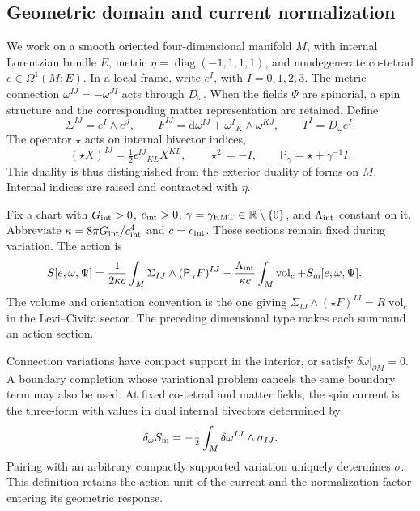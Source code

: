\subsection{Geometric domain and current normalization}
\label{vii:subsec:dominio-corriente-cartan}

We work on a smooth oriented four-dimensional manifold \(M\),
with internal Lorentzian bundle \(E\), metric
\(\eta=\operatorname{diag}(-1,1,1,1)\), and nondegenerate co-tetrad
\(e\in\Omega^1(M;E)\). In a local frame, write
\(e^I\), with \(I=0,1,2,3\). The metric connection
\(\omega^{IJ}=-\omega^{JI}\) acts through \(D_\omega\).
When the fields \(\Psi\) are spinorial, a spin structure and the
corresponding matter representation are retained. Define
\begin{equation}
 \Sigma^{IJ}=e^I\wedge e^J,\qquad
 F^{IJ}=\mathrm d\omega^{IJ}+\omega^I{}_{K}\wedge\omega^{KJ},
 \qquad T^I=D_\omega e^I.
 \label{vii:eq:campos-cartan}
\end{equation}
The operator \(\star\) acts on internal bivector indices,
\begin{equation}
 (\star X)^{IJ}=\tfrac12\epsilon^{IJ}{}_{KL}X^{KL},
 \qquad \star^2=-I,\qquad
 \mathsf P_\gamma=\star+\gamma^{-1}I.
 \label{vii:eq:operador-holst}
\end{equation}
This duality is thus distinguished from the exterior duality of forms
on \(M\). Internal indices are raised and contracted with \(\eta\).

Fix a chart with \(G_{\rm int}>0\), \(c_{\rm int}>0\),
\(\gamma=\gamma_{\rm HMT}\in\mathbb R\setminus\{0\}\), and
\(\Lambda_{\rm int}\) constant on it. Abbreviate
\(\kappa=8\pi G_{\rm int}/c_{\rm int}^4\) and \(c=c_{\rm int}\).
These sections remain fixed during variation. The action is
\begin{equation}
 \begin{split}
 S[e,\omega,\Psi]={}&
 \frac1{2\kappa c}\int_M\Sigma_{IJ}\wedge
                         (\mathsf P_\gamma F)^{IJ}
 -\frac{\Lambda_{\rm int}}{\kappa c}
                         \int_M\operatorname{vol}_e
 +S_{\rm m}[e,\omega,\Psi].
 \end{split}
 \label{vii:eq:accion-cartan-holst}
\end{equation}
The volume and orientation convention is the one giving
\(\Sigma_{IJ}\wedge(\star F)^{IJ}=R\operatorname{vol}_e\)
in the Levi--Civita sector. The preceding dimensional type makes each
summand an action section.

Connection variations have compact support in the interior, or satisfy
\(\delta\omega|_{\partial M}=0\). A boundary completion whose
variational problem cancels the same boundary term may also be used.
At fixed co-tetrad and matter fields, the spin current is the
three-form with values in dual internal bivectors determined by
\begin{equation}
 \delta_\omega S_{\rm m}
 =-\tfrac12\int_M\delta\omega^{IJ}\wedge\sigma_{IJ}.
 \label{vii:eq:corriente-variacional}
\end{equation}
Pairing with an arbitrary compactly supported variation uniquely
determines \(\sigma\). This definition retains the action unit of
the current and the normalization factor entering its geometric response.

